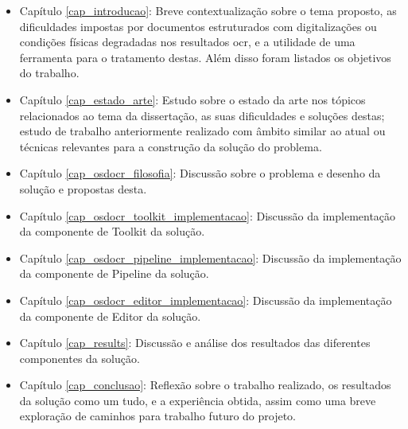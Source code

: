 \begin{itemize}
    \item Capítulo \ref{cap_introducao}: Breve contextualização sobre o tema proposto, as dificuldades impostas por documentos estruturados com digitalizações ou condições físicas degradadas nos resultados \acrshort{ocr}, e a utilidade de uma ferramenta para o tratamento destas. Além disso foram listados os objetivos do trabalho.

    \item Capítulo \ref{cap_estado_arte}: Estudo sobre o estado da arte nos tópicos relacionados ao tema da dissertação, as suas dificuldades e soluções destas; estudo de trabalho anteriormente realizado com âmbito similar ao atual ou técnicas relevantes para a construção da solução do problema.
    
    \item Capítulo \ref{cap_osdocr_filosofia}: Discussão sobre o problema e desenho da solução e propostas desta.

    \item Capítulo \ref{cap_osdocr_toolkit_implementacao}: Discussão da implementação da componente de Toolkit da solução.
    
    \item Capítulo \ref{cap_osdocr_pipeline_implementacao}: Discussão da implementação da componente de Pipeline da solução.
    
    \item Capítulo \ref{cap_osdocr_editor_implementacao}: Discussão da implementação da componente de Editor da solução.
    
    \item Capítulo \ref{cap_results}: Discussão e análise dos resultados das diferentes componentes da solução.
    
    \item Capítulo \ref{cap_conclusao}: Reflexão sobre o trabalho realizado, os resultados da solução como um tudo, e a experiência obtida, assim como uma breve exploração de caminhos para trabalho futuro do projeto. 
\end{itemize}
